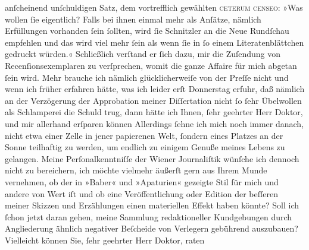                anſcheinend unſchuldigen Satz, dem vortrefflich gewählten \textsc{ceterum censeo}: »Was wollen{ }ſie eigentlich? Falls bei ihnen einmal mehr als
               Anſätze, nämlich Erfüllungen vorhanden{ }ſein{ }ſollten, wird{ }ſie Schnitzler an die Neue Rundſchau empfehlen und das wird viel mehr{ }ſein als wenn{ }ſie in{ }ſo einem Literatenblättchen gedruckt würden.« Schließlich
               verſtand er{ }ſich dazu, mir die Zuſendung von Recenſionsexemplaren zu verſprechen,
               womit die ganze Affaire für mich abgetan{ }ſein wird. Mehr brauche ich nämlich
               glücklicherweiſe von der Preſſe nicht und wenn
               ich früher erfahren hätte, was ich leider erſt Donnerstag erfuhr, daß
               nämlich an der Verzögerung der Approbation {\pb}meiner Diſſertation nicht{ }ſo{ }ſehr Übelwollen als Schlamperei die Schuld trug, dann hätte ich Ihnen,{ }ſehr geehrter
               Herr Doktor, und mir allerhand erſparen können{\dotsfour} Allerdings{ }ſehne ich mich noch immer danach, nicht etwa einer Zelle in jener papierenen Welt,{ }ſondern eines Platzes an der Sonne teilhaftig zu werden, um endlich zu einigem Genuße
               meines Lebens zu gelangen. Meine Perſonalkenntniſſe der Wiener Journaliſtik wünſche ich dennoch nicht zu bereichern, ich möchte
               vielmehr äußerſt gern aus Ihrem Munde vernehmen, ob der in »Baber« und »Apaturien«
               gezeigte Stil für mich und andere von Wert iſt und ob eine Veröffentlichung oder
               Edition der beſſeren meiner Skizzen und Erzählungen einen materiellen Effekt haben
               könnte? Soll ich{ }ſchon jetzt daran gehen, meine Sammlung redaktioneller Kundgebungen
               durch Angliederung ähnlich negativer Beſcheide von Verlegern gebührend auszubauen?
               Vielleicht können Sie,{ }ſehr geehrter Herr Doktor, raten\pend
           
